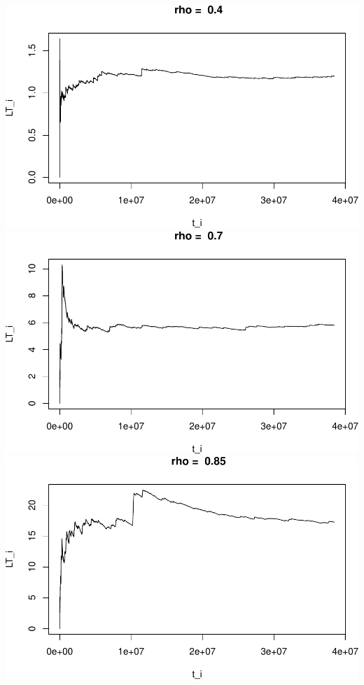 \documentclass[]{article}
\begin{document}
\includegraphics{003_files/figure-latex/unnamed-chunk-11-1.pdf}
\includegraphics{003_files/figure-latex/unnamed-chunk-11-2.pdf}
\includegraphics{003_files/figure-latex/unnamed-chunk-11-3.pdf}
\end{document}
